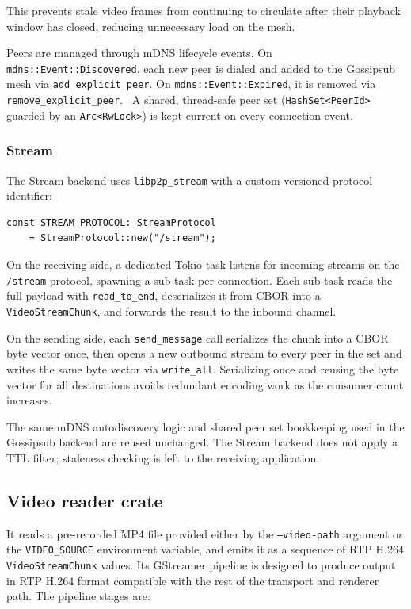 This prevents stale video frames from continuing to circulate after their playback window has closed, reducing unnecessary load on the mesh.

Peers are managed through mDNS lifecycle events.
On \texttt{mdns::Event::}\allowbreak\texttt{Discovered}, each new peer is dialed and added to the Gossipsub mesh via \texttt{add\_explicit\_peer}.
On \texttt{mdns::Event::}\allowbreak\texttt{Expired}, it is removed via \texttt{remove\_explicit\_peer}.~\cite{cheshireMulticastDNS2013}
A shared, thread-safe peer set (\texttt{HashSet<PeerId>} guarded by an \texttt{Arc<RwLock>}) is kept current on every connection event.

\subsubsection{Stream}
The Stream backend uses \texttt{libp2p\_stream} with a custom versioned protocol identifier:

\begin{Verbatim}[samepage=true]
const STREAM_PROTOCOL: StreamProtocol
    = StreamProtocol::new("/stream");
\end{Verbatim}

On the receiving side, a dedicated Tokio task listens for incoming streams on the \texttt{/stream} protocol, spawning a sub-task per connection. Each sub-task reads the full payload with \texttt{read\_to\_end}, deserializes it from CBOR into a \texttt{VideoStreamChunk}, and forwards the result to the inbound channel.

On the sending side, each \texttt{send\_message} call serializes the chunk into a CBOR byte vector once, then opens a new outbound stream to every peer in the set and writes the same byte vector via \texttt{write\_all}. Serializing once and reusing the byte vector for all destinations avoids redundant encoding work as the consumer count increases.

The same mDNS autodiscovery logic and shared peer set bookkeeping used in the Gossipsub backend are reused unchanged. The Stream backend does not apply a TTL filter; staleness checking is left to the receiving application.

\subsection{Video reader crate}
\label{sec:video_reader_pipeline}
It reads a pre-recorded MP4 file provided either by the \texttt{--video-path} argument or the \texttt{VIDEO\_SOURCE} environment variable, and emits it as a sequence of \ac{RTP} H.264 \texttt{VideoStreamChunk} values. Its GStreamer pipeline is designed to produce output in \ac{RTP} H.264 format compatible with the rest of the transport and renderer path. The pipeline stages are:

